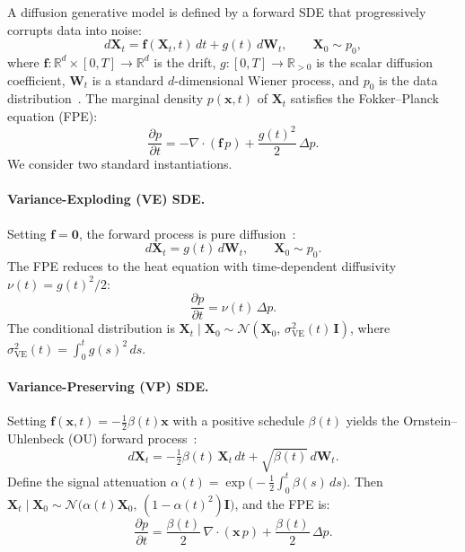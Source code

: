 \documentclass[11pt]{article}
\newcommand{\R}{\mathbb{R}}
\begin{document}
A diffusion generative model is defined by a forward SDE that progressively corrupts data into noise:
\begin{equation}\label{eq:forward-sde}
  d\bm{X}_t = \bm{f}(\bm{X}_t, t)\,dt + g(t)\,d\bm{W}_t, \qquad \bm{X}_0 \sim p_0,
\end{equation}
where $\bm{f}\colon \R^d \times [0,T] \to \R^d$ is the drift, $g\colon [0,T] \to \R_{>0}$ is the scalar diffusion coefficient, $\bm{W}_t$ is a standard $d$-dimensional Wiener process, and $p_0$ is the data distribution~\citep{song2021score}.
The marginal density $p(\bm{x},t)$ of $\bm{X}_t$ satisfies the Fokker--Planck equation (FPE):
\begin{equation}\label{eq:fpe}
  \frac{\partial p}{\partial t}
  = -\nabla \cdot (\bm{f}\, p)
    + \frac{g(t)^2}{2}\,\Delta p.
\end{equation}
We consider two standard instantiations.

\paragraph{Variance-Exploding (VE) SDE.}
Setting $\bm{f} = \bm{0}$, the forward process is pure diffusion~\citep{song2019generative, song2020improved}:
\begin{equation}\label{eq:ve-sde}
  d\bm{X}_t = g(t)\,d\bm{W}_t, \qquad \bm{X}_0 \sim p_0.
\end{equation}
The FPE reduces to the heat equation with time-dependent diffusivity $\nu(t) = g(t)^2/2$:
\begin{equation}\label{eq:ve-fpe}
  \frac{\partial p}{\partial t} = \nu(t)\,\Delta p.
\end{equation}
The conditional distribution is $\bm{X}_t \mid \bm{X}_0 \sim \mathcal{N}(\bm{X}_0,\, \sigma^2_{\mathrm{VE}}(t)\,\bm{I})$, where $\sigma^2_{\mathrm{VE}}(t) = \int_0^t g(s)^2\,ds$.

\paragraph{Variance-Preserving (VP) SDE.}
Setting $\bm{f}(\bm{x},t) = -\tfrac{1}{2}\beta(t)\bm{x}$ with a positive schedule $\beta(t)$ yields the Ornstein--Uhlenbeck (OU) forward process~\citep{ho2020denoising, song2021score}:
\begin{equation}\label{eq:vp-sde}
  d\bm{X}_t = -\tfrac{1}{2}\beta(t)\,\bm{X}_t\,dt + \sqrt{\beta(t)}\,d\bm{W}_t.
\end{equation}
Define the signal attenuation $\alpha(t) = \exp\!\bigl(-\tfrac{1}{2}\int_0^t \beta(s)\,ds\bigr)$.
Then $\bm{X}_t \mid \bm{X}_0 \sim \mathcal{N}\!\bigl(\alpha(t)\bm{X}_0,\, (1-\alpha(t)^2)\bm{I}\bigr)$, and the FPE is:
\begin{equation}\label{eq:vp-fpe}
  \frac{\partial p}{\partial t}
  = \frac{\beta(t)}{2}\,\nabla \cdot (\bm{x}\, p)
    + \frac{\beta(t)}{2}\,\Delta p.
\end{equation}
\end{document}
